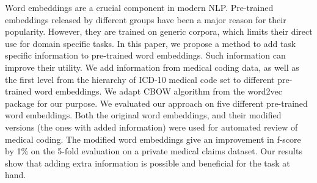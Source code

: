 Word embeddings are a crucial component in modern NLP. Pre-trained embeddings released by different groups have been a major reason for their popularity. However, they are trained on generic corpora, which limits their direct use for domain specific tasks. In this paper, we propose a method to add task specific information to pre-trained word embeddings. Such information can improve their utility. We add information from medical coding data, as well as the first level from the hierarchy of ICD-10 medical code set to different pre-trained word embeddings. We adapt CBOW algorithm from the word2vec package for our purpose. We evaluated our approach on five different pre-trained word embeddings. Both the original word embeddings, and their modified versions (the ones with added information) were used for automated review of medical coding. The modified word embeddings give an improvement in f-score by 1\% on the 5-fold evaluation on a private medical claims dataset. Our results show that adding extra information is possible and beneficial for the task at hand.
